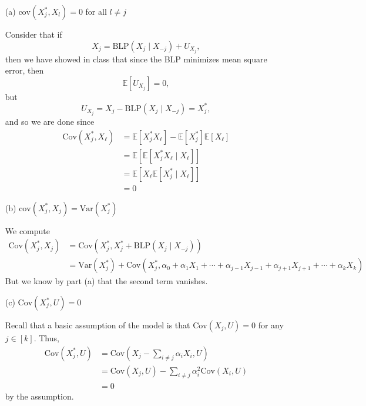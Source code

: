 \documentclass[11pt]{article}
\newcommand{\Var}{\text{Var}}
\newcommand{\Cov}{\text{Cov}}
\newcommand{\bbE}{\mathbb{E}}
\begin{document}
\begin{enumerate}
    \item[(a)] $\text{cov}(X^*_j, X_l) = 0$ for all $l \ne j$
    \begin{solution}
        Consider that if
        \[X_j = \text{BLP}(X_j \mid X_{-j}) + U_{X_j},\] then we have showed in class that since the BLP minimizes mean square error, then 
        \[\bbE[U_{X_j}] = 0,\] but 
        \[U_{X_j} = X_j - \text{BLP}(X_j \mid X_{-j}) = X_j^*,\] and so we are done since 
        \begin{align*}
        \Cov(X_j^*, X_\ell) &= \bbE[X_j^* X_\ell] - \bbE[X_j^*]\bbE[X_{\ell}]\\
        &= \bbE[\bbE[X_j^* X_\ell \mid X_\ell]]\\
        &= \bbE[X_\ell \bbE[X_j^* \mid X_\ell]]\\
        &= 0
        \end{align*}
        
    \end{solution}
    
    \item[(b)] $\text{cov}(X^*_j, X_j) = \text{Var}(X^*_j)$
    \begin{solution}
        We compute
        \begin{align*}
            \Cov(X_j^*, X_j) &= \Cov(X_j^*, X_j^* + \text{BLP}(X_j \mid X_{-j}))\\
            &= \Var(X_j^*) + \Cov(X_j^*, \alpha_0 + \alpha_1 X_1 + \cdots + \alpha_{j-1}X_{j-1} + \alpha_{j+1}X_{j+1} + \cdots + \alpha_k X_k)
        \end{align*}
        But we know by part (a) that the second term vanishes.
    \end{solution}
    
    \item[(c)] $\text{Cov}(X^*_j, U) = 0$
    \begin{solution}
       Recall that a basic assumption of the model is that $\Cov(X_j, U)=  0$ for any $j \in [k].$ Thus,  
    \begin{align*}
        \Cov(X_j^*, U) &= \Cov(X_j - \sum_{i\neq j} \alpha_i X_i, U)\\
        &= \Cov(X_j, U) - \sum_{i\neq j} \alpha_i^2 \Cov(X_i, U)\\
        &= 0
    \end{align*}
    by the assumption.
    \end{solution}
    
\end{enumerate}
\end{document}
